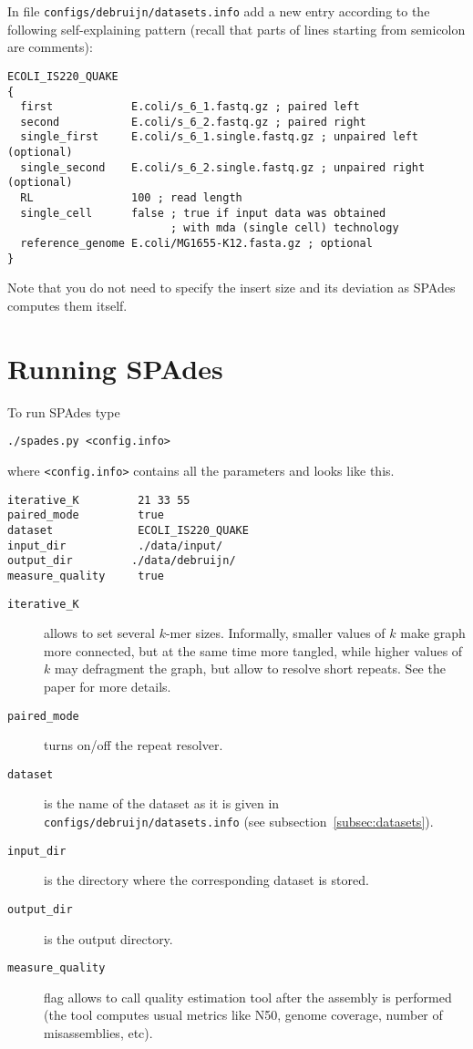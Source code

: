 \documentclass{article}
\def\spades{SPAdes}
\begin{document}
In file {\tt configs/debruijn/datasets.info} add a new entry according to the following self-explaining pattern (recall that parts of lines starting from
semicolon are comments):
\begin{lstlisting}
ECOLI_IS220_QUAKE
{
  first            E.coli/s_6_1.fastq.gz ; paired left
  second           E.coli/s_6_2.fastq.gz ; paired right
  single_first     E.coli/s_6_1.single.fastq.gz ; unpaired left (optional)
  single_second    E.coli/s_6_2.single.fastq.gz ; unpaired right (optional)
  RL               100 ; read length
  single_cell      false ; true if input data was obtained 
                         ; with mda (single cell) technology
  reference_genome E.coli/MG1655-K12.fasta.gz ; optional
}
\end{lstlisting}
Note that you do not need to specify the insert size and its deviation as {\spades}
computes them itself.

\section{Running {\spades}}
To run {\spades} type
\begin{lstlisting}
./spades.py <config.info>
\end{lstlisting}
where {\tt <config.info>} contains all the parameters and looks like this.
\begin{lstlisting}
iterative_K         21 33 55
paired_mode         true 
dataset             ECOLI_IS220_QUAKE
input_dir           ./data/input/
output_dir         ./data/debruijn/
measure_quality     true
\end{lstlisting}

\begin{description}
\item[{\tt iterative\_K}] allows to set several $k$-mer sizes. Informally, smaller values of $k$ make graph more connected,
but at the same time more tangled, while higher values of $k$ may defragment the graph, but allow to resolve short repeats.
See the paper for more details.
\item[{\tt paired\_mode}] turns on/off the repeat resolver.
\item[{\tt dataset}] is the name of the dataset as it is given in {\tt configs/debruijn/datasets.info} (see subsection~\ref{subsec:datasets}).
\item[{\tt input\_dir}] is the directory where the corresponding dataset is stored.
\item[{\tt output\_dir}] is the output directory.
\item[{\tt measure\_quality}] flag allows to call quality estimation tool after the assembly is performed (the tool computes usual
metrics like N50, genome coverage, number of misassemblies, etc).
\end{description}
\end{document}

